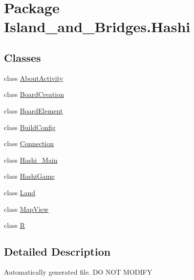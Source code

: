 \hypertarget{namespace_island__and___bridges_1_1_hashi}{}\section{Package Island\+\_\+and\+\_\+\+Bridges.\+Hashi}
\label{namespace_island__and___bridges_1_1_hashi}
\subsection*{Classes}
\begin{DoxyCompactItemize}
\item 
class \mbox{\hyperlink{class_island__and___bridges_1_1_hashi_1_1_about_activity}{About\+Activity}}
\item 
class \mbox{\hyperlink{class_island__and___bridges_1_1_hashi_1_1_board_creation}{Board\+Creation}}
\item 
class \mbox{\hyperlink{class_island__and___bridges_1_1_hashi_1_1_board_element}{Board\+Element}}
\item 
class \mbox{\hyperlink{class_island__and___bridges_1_1_hashi_1_1_build_config}{Build\+Config}}
\item 
class \mbox{\hyperlink{class_island__and___bridges_1_1_hashi_1_1_connection}{Connection}}
\item 
class \mbox{\hyperlink{class_island__and___bridges_1_1_hashi_1_1_hashi___main}{Hashi\+\_\+\+Main}}
\item 
class \mbox{\hyperlink{class_island__and___bridges_1_1_hashi_1_1_hashi_game}{Hashi\+Game}}
\item 
class \mbox{\hyperlink{class_island__and___bridges_1_1_hashi_1_1_land}{Land}}
\item 
class \mbox{\hyperlink{class_island__and___bridges_1_1_hashi_1_1_map_view}{Map\+View}}
\item 
class \mbox{\hyperlink{class_island__and___bridges_1_1_hashi_1_1_r}{R}}
\end{DoxyCompactItemize}


\subsection{Detailed Description}
Automatically generated file. DO N\+OT M\+O\+D\+I\+FY 